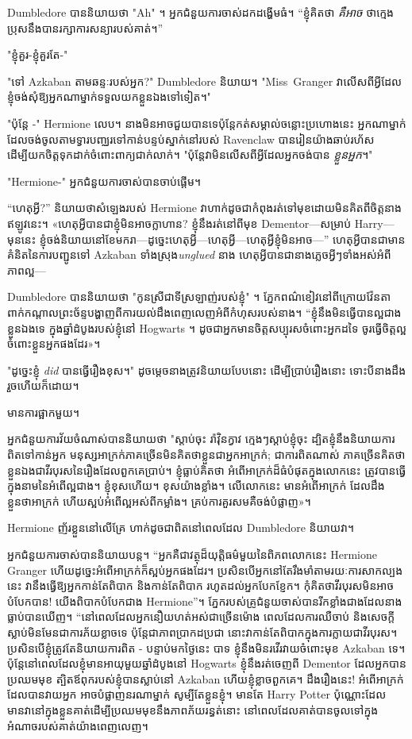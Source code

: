 Dumbledore បាននិយាយថា "Ah" ។ អ្នកជំនួយការចាស់ដកដង្ហើមធំ។ “ខ្ញុំ​គិត​ថា \emph{គឺ​អាច} ថា​ក្មេង​ប្រុស​នឹង​បាន​រក្សា​ការ​សន្យា​របស់​គាត់។”

"ខ្ញុំគួរ-ខ្ញុំគួរតែ-"

"ទៅ Azkaban តាមឆន្ទៈរបស់អ្នក?" Dumbledore និយាយ។ "Miss~Granger វាលើសពីអ្វីដែលខ្ញុំចង់សុំឱ្យអ្នកណាម្នាក់ទទួលយកខ្លួនឯងទៅទៀត។"

"ប៉ុន្តែ -" Hermione លេប។ នាងមិនអាចជួយបានទេប៉ុន្តែកត់សម្គាល់ចន្លោះប្រហោងនេះ អ្នកណាម្នាក់ដែលចង់ចូលតាមទ្វារបញ្ឈរទៅកាន់បន្ទប់ស្នាក់នៅរបស់ Ravenclaw បានរៀនយ៉ាងឆាប់រហ័សដើម្បីយកចិត្តទុកដាក់ចំពោះពាក្យជាក់លាក់។ "ប៉ុន្តែវាមិនលើសពីអ្វីដែលអ្នកចង់បាន \emph{ខ្លួនអ្នក}។"

"Hermione-" អ្នកជំនួយការចាស់បានចាប់ផ្តើម។

“ហេតុអ្វី?” និយាយ​ថា​សំឡេង​របស់ Hermione វា​ហាក់​ដូច​ជា​កំពុង​រត់​ទៅ​មុខ​ដោយ​មិន​គិត​ពី​ចិត្ត​នាង​ឥឡូវ​នេះ។ «ហេតុ​អ្វី​បាន​ជា​ខ្ញុំ​មិន​អាច​ក្លាហាន? ខ្ញុំនឹងរត់នៅពីមុខ Dementor—សម្រាប់ Harry—មុននេះ ខ្ញុំចង់និយាយនៅខែមករា—ដូច្នេះហេតុអ្វី—ហេតុអ្វី—ហេតុអ្វីខ្ញុំមិនអាច—” ហេតុអ្វីបានជាមានគំនិតនៃការបញ្ជូនទៅ Azkaban ទាំងស្រុង\emph{unglued } នាង ហេតុអ្វីបានជានាងភ្លេចអ្វីៗទាំងអស់អំពីភាពល្អ—

Dumbledore បាននិយាយថា "កូនស្រីជាទីស្រឡាញ់របស់ខ្ញុំ" ។ ភ្នែកពណ៌ខៀវនៅពីក្រោយវ៉ែនតាពាក់កណ្តាលព្រះច័ន្ទបង្ហាញពីការយល់ដឹងពេញលេញអំពីកំហុសរបស់នាង។ “ខ្ញុំនឹងមិនធ្វើបានល្អជាងខ្លួនឯងទេ ក្នុងឆ្នាំដំបូងរបស់ខ្ញុំនៅ Hogwarts ។ ដូច​ជា​អ្នក​មាន​ចិត្ត​សប្បុរស​ចំពោះ​អ្នក​ដទៃ ចូរ​ធ្វើ​ចិត្ត​ល្អ​ចំពោះ​ខ្លួន​អ្នក​ផង​ដែរ»។

"ដូច្នេះខ្ញុំ \emph{did} បានធ្វើរឿងខុស។" ដូចម្ដេចនាងត្រូវនិយាយបែបនោះ ដើម្បីប្រាប់រឿងនោះ ទោះបីនាងដឹងរួចហើយក៏ដោយ។

មានការផ្អាកមួយ។

អ្នកជំនួយការវ័យចំណាស់បាននិយាយថា "ស្តាប់ចុះ រ៉ាវ៉ិនក្វាវ ក្មេងៗស្តាប់ខ្ញុំចុះ ដ្បិតខ្ញុំនឹងនិយាយការពិតទៅកាន់អ្នក មនុស្សអាក្រក់ភាគច្រើនមិនគិតថាខ្លួនជាអ្នកអាក្រក់; ជាការពិតណាស់ ភាគច្រើនគិតថាខ្លួនឯងជាវីរបុរសនៃរឿងដែលពួកគេប្រាប់។ ខ្ញុំធ្លាប់គិតថា អំពើអាក្រក់ដ៏ធំបំផុតក្នុងលោកនេះ ត្រូវបានធ្វើក្នុងនាមនៃអំពើល្អជាង។ ខ្ញុំខុសហើយ។ ខុស​យ៉ាង​ខ្លាំង។ លើលោកនេះ មានអំពើអាក្រក់ ដែលដឹងខ្លួនថាអាក្រក់ ហើយស្អប់អំពើល្អអស់ពីកម្លាំង។ គ្រប់​ការ​គួរ​សម​គឺ​ចង់​បំផ្លាញ»។

Hermione ញ័រខ្លួននៅលើគ្រែ ហាក់ដូចជាពិតនៅពេលដែល Dumbledore និយាយវា។

អ្នកជំនួយការចាស់បាននិយាយបន្ត។ “អ្នកគឺជាវត្ថុដ៏យុត្តិធម៌មួយនៃពិភពលោកនេះ Hermione Granger ហើយដូច្នេះអំពើអាក្រក់ក៏ស្អប់អ្នកផងដែរ។ ប្រសិនបើអ្នកនៅតែរឹងមាំតាមរយៈការសាកល្បងនេះ វានឹងធ្វើឱ្យអ្នកកាន់តែពិបាក និងកាន់តែពិបាក រហូតដល់អ្នកបែកខ្ញែក។ កុំគិតថាវីរបុរសមិនអាចបំបែកបាន! យើងពិបាកបំបែកជាង Hermione”។ ភ្នែក​របស់​គ្រូ​ជំនួយ​ចាស់​បាន​រីក​ខ្លាំង​ជាង​ដែល​នាង​ធ្លាប់​បាន​ឃើញ។ “នៅពេលដែលអ្នកនឿយហត់អស់ជាច្រើនម៉ោង ពេលដែលការឈឺចាប់ និងសេចក្តីស្លាប់មិនមែនជាការភ័យខ្លាចទេ ប៉ុន្តែជាភាពប្រាកដប្រជា នោះវាកាន់តែពិបាកក្នុងការក្លាយជាវីរបុរស។ ប្រសិនបើខ្ញុំត្រូវតែនិយាយការពិត - បន្ទាប់មកថ្ងៃនេះ បាទ ខ្ញុំនឹងមិនរវើរវាយចំពោះមុខ Azkaban ទេ។ ប៉ុន្តែនៅពេលដែលខ្ញុំមានអាយុមួយឆ្នាំដំបូងនៅ Hogwarts ខ្ញុំនឹងរត់ចេញពី Dementor ដែលអ្នកបានប្រឈមមុខ ត្បិតឪពុករបស់ខ្ញុំបានស្លាប់នៅ Azkaban ហើយខ្ញុំខ្លាចពួកគេ។ ដឹងរឿងនេះ! អំពើអាក្រក់ដែលបានវាយអ្នក អាចបំផ្លាញនរណាម្នាក់ សូម្បីតែខ្លួនខ្ញុំ។ មានតែ Harry Potter ប៉ុណ្ណោះដែលមានវានៅក្នុងខ្លួនគាត់ដើម្បីប្រឈមមុខនឹងភាពភ័យរន្ធត់នោះ នៅពេលដែលគាត់បានចូលទៅក្នុងអំណាចរបស់គាត់យ៉ាងពេញលេញ។

